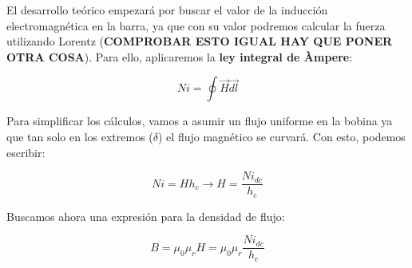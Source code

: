 El desarrollo teórico empezará por buscar el valor de la inducción electromagnética en la barra, ya que con su valor podremos calcular la fuerza utilizando Lorentz (\textbf{COMPROBAR ESTO IGUAL HAY QUE PONER OTRA COSA}). Para ello, aplicaremos la \textbf{ley integral de Àmpere}:

\[
Ni=\oint{\vec{H}\vec{dl}}
\]

Para simplificar los cálculos, vamos a asumir un flujo uniforme en la bobina ya que tan solo en los extremos (\( \delta \)) el flujo magnético se curvará. Con esto, podemos escribir:

\[
Ni=Hh_c\to H=\frac{Ni_{dc}}{h_c}
\]

Buscamos ahora una expresión para la densidad de flujo:

\[
B=\mu_0\mu_r H=\mu_0\mu_r\frac{Ni_{dc}}{h_c}
\]